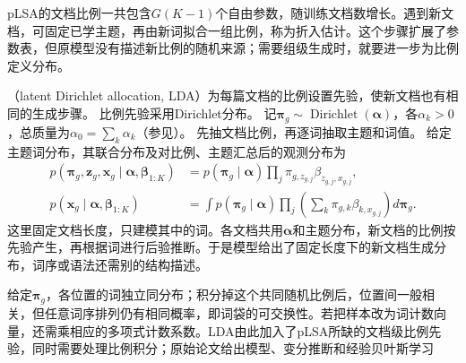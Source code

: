 pLSA的文档比例一共包含$G(K-1)$个自由参数，随训练文档数增长。遇到新文档，可固定已学主题，再由新词拟合一组比例，称为折入估计。这个步骤扩展了参数表，但原模型没有描述新比例的随机来源；需要组级生成时，就要进一步为比例定义分布。

（latent Dirichlet allocation, LDA）为每篇文档的比例设置先验，使新文档也有相同的生成步骤。
比例先验采用Dirichlet分布。
记$\bm\pi_g\sim\operatorname{Dirichlet}(\bm\alpha)$，各$\alpha_k>0$，总质量为$\alpha_0=\sum_k\alpha_k$（参见）。
先抽文档比例，再逐词抽取主题和词值。
给定主题词分布，其联合分布及对比例、主题汇总后的观测分布为
\begin{equation}
  \label{eq:pgm-static-directed-lda}
  \begin{aligned}
    p(\bm{\pi}_g,\bm{z}_g,\bm{x}_g\mid
          \bm{\alpha},\bm{\beta}_{1:K})
      &=p(\bm{\pi}_g\mid\bm{\alpha})
         \prod_j\pi_{g,z_{g,j}}\beta_{z_{g,j},x_{g,j}},\\
    p(\bm{x}_g\mid\bm{\alpha},\bm{\beta}_{1:K})
      &=\int p(\bm{\pi}_g\mid\bm{\alpha})
          \prod_j\left(\sum_k
              \pi_{g,k}\beta_{k,x_{g,j}}\right)d\bm{\pi}_g.
  \end{aligned}
\end{equation}
这里固定文档长度，只建模其中的词。各文档共用$\bm\alpha$和主题分布，新文档的比例按先验产生，再根据词进行后验推断。于是模型给出了固定长度下的新文档生成分布，词序或语法还需别的结构描述。

给定$\bm\pi_g$，各位置的词独立同分布；积分掉这个共同随机比例后，位置间一般相关，但任意词序排列仍有相同概率，即词袋的可交换性。若把样本改为词计数向量，还需乘相应的多项式计数系数。LDA由此加入了pLSA所缺的文档级比例先验，同时需要处理比例积分；原始论文给出模型、变分推断和经验贝叶斯学习

